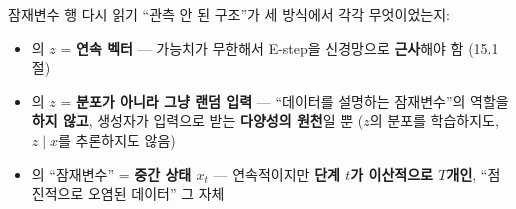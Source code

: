 \begin{frame}{잠재변수 행 다시 읽기}
  ``관측 안 된 구조''가 세 방식에서 각각 무엇이었는지:
  \begin{itemize}
    \item {}의 $z$ = \textbf{연속 벡터} — 가능치가 무한해서
      E-step을 신경망으로 \textbf{근사}해야 함 (15.1절)
    \item {}의 $z$ = \textbf{분포가 아니라 그냥 랜덤 입력} —
      ``데이터를 설명하는 잠재변수''의 역할을 \textbf{하지 않고},
      생성자가 입력으로 받는 \textbf{다양성의 원천}일 뿐
      ($z$의 분포를 학습하지도, $z \mid x$를 추론하지도 않음)
    \item {}의 ``잠재변수'' = \textbf{중간 상태 $x_t$}
      — 연속적이지만 \textbf{단계 $t$가 이산적으로 $T$개인},
      ``점진적으로 오염된 데이터'' 그 자체
  \end{itemize}
\end{frame}
